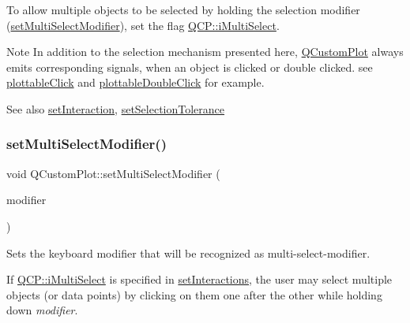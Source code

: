 To allow multiple objects to be selected by holding the selection modifier (\mbox{\hyperlink{class_q_custom_plot_a8fc96e3b5138a06759a2a90c166df516}{set\+Multi\+Select\+Modifier}}), set the flag \mbox{\hyperlink{namespace_q_c_p_a2ad6bb6281c7c2d593d4277b44c2b037aef673112c5067c3cf4cfddb62da7265d}{Q\+C\+P\+::i\+Multi\+Select}}.

\begin{DoxyNote}{Note}
In addition to the selection mechanism presented here, \mbox{\hyperlink{class_q_custom_plot}{Q\+Custom\+Plot}} always emits corresponding signals, when an object is clicked or double clicked. see \mbox{\hyperlink{class_q_custom_plot_af5fe78b8bc9e4e96df921612837fd4fd}{plottable\+Click}} and \mbox{\hyperlink{class_q_custom_plot_a86a3ab7263c9c4e008e70d6c5fce9fbd}{plottable\+Double\+Click}} for example.
\end{DoxyNote}
\begin{DoxySeeAlso}{See also}
\mbox{\hyperlink{class_q_custom_plot_a422bf1bc6d56dac75a3d805d9a65902c}{set\+Interaction}}, \mbox{\hyperlink{class_q_custom_plot_a4dc31241d7b09680950e19e5f971ed93}{set\+Selection\+Tolerance}} 
\end{DoxySeeAlso}
\mbox{\label{class_q_custom_plot_a8fc96e3b5138a06759a2a90c166df516}} 
\subsubsection{\texorpdfstring{setMultiSelectModifier()}{setMultiSelectModifier()}}
{\footnotesize\ttfamily void Q\+Custom\+Plot\+::set\+Multi\+Select\+Modifier (\begin{DoxyParamCaption}\item[{Qt\+::\+Keyboard\+Modifier}]{modifier }\end{DoxyParamCaption})}

Sets the keyboard modifier that will be recognized as multi-\/select-\/modifier.

If \mbox{\hyperlink{namespace_q_c_p_a2ad6bb6281c7c2d593d4277b44c2b037aef673112c5067c3cf4cfddb62da7265d}{Q\+C\+P\+::i\+Multi\+Select}} is specified in \mbox{\hyperlink{class_q_custom_plot_a5ee1e2f6ae27419deca53e75907c27e5}{set\+Interactions}}, the user may select multiple objects (or data points) by clicking on them one after the other while holding down {\itshape modifier}.

